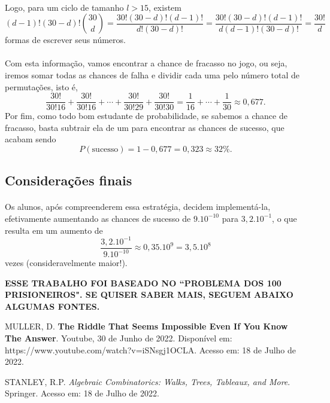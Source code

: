\documentclass{article}
\begin{document}
        \paragraph{}Logo, para um ciclo de tamanho $l > 15$, existem 
        $$
        (d-1)!(30-d)!\binom{30}{d} = \frac{30!(30-d)!(d-1)!}{d!(30-d)!} = \frac{30!(30-d)!(d-1)!}{d(d-1)!(30-d)!} = \frac{30!}{d}
        $$
        formas de escrever seus n\'umeros. 

        \paragraph{}Com esta informa\c c\~ao, vamos encontrar a chance de fracasso no jogo, ou seja, iremos somar todas as chances de falha e dividir cada uma pelo n\'umero total
        de permuta\c c\~oes, isto \'e, 
        $$
            \frac{30!}{30!16} + \frac{30!}{30!16} + \cdots + \frac{30!}{30!29} + \frac{30!}{30!30} = \frac{1}{16} + \cdots + \frac{1}{30} \approx 0,677.
        $$
        Por fim, como todo bom estudante de probabilidade, se sabemos a chance de fracasso, basta subtrair ela de um para encontrar as chances de sucesso, que acabam sendo
        $$
            P(\text{sucesso}) = 1 - 0,677 = 0,323 \approx 32\%.
        $$
    \subsection{Considera\c c\~oes finais}
        \paragraph{}Os alunos, ap\'os compreenderem essa estrat\'egia, decidem implement\'a-la, efetivamente aumentando as chances de sucesso de $9.10^{-10}$ para $3,2.10^{-1}$, o que
        resulta em um aumento de 
        $$
            \frac{3,2.10^{-1}}{9.10^{-10}} \approx 0,35.10^{9} = 3,5.10^{8}
        $$
        vezes (consideravelmente maior!). 

    \begin{center}
        \textbf{\MakeUppercase{Esse trabalho foi baseado no ``Problema dos 100 Prisioneiros". Se quiser saber mais, seguem abaixo algumas fontes.}}
    \end{center}

    \begin{thebibliography}{Xyz12}
        \item MULLER, D. \textbf{The Riddle That Seems Impossible Even If You Know The Answer}. Youtube, 30 de Junho de 2022. Dispon\'ivel em: https://www.youtube.com/watch?v=iSNsgj1OCLA. Acesso em: 18 de Julho de 2022.
        \item STANLEY, R.P. \textit{Algebraic Combinatorics: Walks, Trees, Tableaux, and More}. Springer. Acesso em: 18 de Julho de 2022.
    \end{thebibliography}
\end{document}

